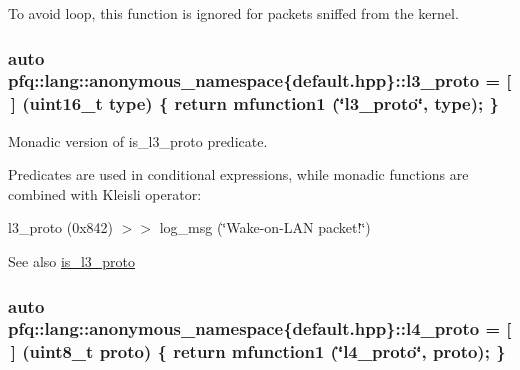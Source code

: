 To avoid loop, this function is ignored for packets sniffed from the kernel. \hypertarget{namespacepfq_1_1lang_1_1anonymous__namespace_02default_8hpp_03_a1515f230673119530cd04f213627976f}{
\subsubsection[{l3\+\_\+proto}]{\setlength{\rightskip}{0pt plus 5cm}auto pfq\+::lang\+::anonymous\+\_\+namespace\{default.\+hpp\}\+::l3\+\_\+proto = \mbox{[}$\,$\mbox{]} (uint16\+\_\+t type) \{ return {\bf mfunction1} (\char`\"{}l3\+\_\+proto\char`\"{}, type); \}}}\label{namespacepfq_1_1lang_1_1anonymous__namespace_02default_8hpp_03_a1515f230673119530cd04f213627976f}


Monadic version of {\ttfamily is\+\_\+l3\+\_\+proto} predicate. 

Predicates are used in conditional expressions, while monadic functions are combined with Kleisli operator\+:

l3\+\_\+proto (0x842) $>$$>$ log\+\_\+msg (\char`\"{}\+Wake-\/on-\/\+L\+A\+N packet!\char`\"{})

\begin{DoxySeeAlso}{See also}
\hyperlink{namespacepfq_1_1lang_1_1anonymous__namespace_02default_8hpp_03_a814bb9c3c833dc2af342d695b1d503e8}{is\+\_\+l3\+\_\+proto} 
\end{DoxySeeAlso}
\hypertarget{namespacepfq_1_1lang_1_1anonymous__namespace_02default_8hpp_03_a8ad2208c91dc3cd4378e715aab5fb4b7}{
\subsubsection[{l4\+\_\+proto}]{\setlength{\rightskip}{0pt plus 5cm}auto pfq\+::lang\+::anonymous\+\_\+namespace\{default.\+hpp\}\+::l4\+\_\+proto = \mbox{[}$\,$\mbox{]} (uint8\+\_\+t proto) \{ return {\bf mfunction1} (\char`\"{}l4\+\_\+proto\char`\"{}, proto); \}}}\label{namespacepfq_1_1lang_1_1anonymous__namespace_02default_8hpp_03_a8ad2208c91dc3cd4378e715aab5fb4b7}


